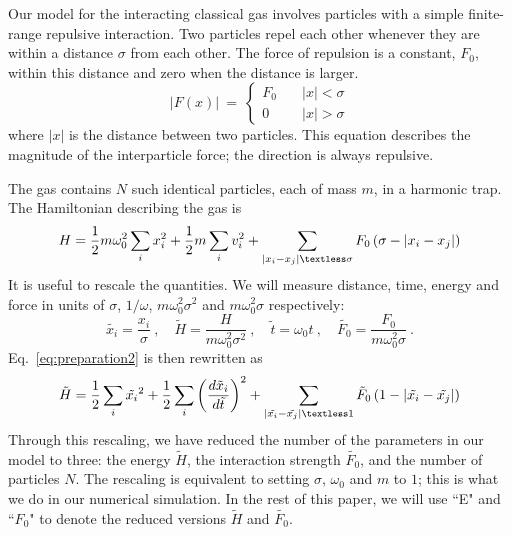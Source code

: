 \documentclass[onecolumn,pra]{revtex4-1}
\begin{document}
Our model for the interacting classical gas involves particles with a simple finite-range repulsive
interaction.  Two particles repel each other whenever they are within a distance $\sigma$ from each
other.  The force of repulsion is a constant, $F_0$, within this distance and zero when the distance
is larger. 
%
\begin{equation}
\Big| F(x) \Big| ~=~ \begin{cases}
F_0  &\quad |x|<\sigma\\
0  &\quad |x|>\sigma
\end{cases}
\label{eq:preparation1}
\end{equation}
where $|x|$ is the distance between two particles.  This equation describes the magnitude of the
interparticle force; the direction is always repulsive.

The gas contains $N$ such identical particles, each of mass $m$, in a harmonic trap.  The
Hamiltonian describing the gas is 
\begin{equation}
H=\frac{1}{2}m\omega_0^2\sum_{i}x_i^2+\frac{1}{2}m\sum_i
v_i^2+\sum_{\left|x_i-x_j\right|\textless\sigma}F_0\left(\sigma-\left|x_i-x_j\right|\right)
\label{eq:preparation2}
\end{equation}
%
It is useful to rescale the quantities.  We will measure distance, time, energy and force in units
of $\sigma$, $1/\omega$, $m\omega_0^2\sigma^2$ and $m\omega_0^2\sigma$ respectively:
\begin{equation} \label{eq:transform}
  \tilde{x_i} = \frac{x_i}{\sigma}\ , \quad 
  \tilde{H} = \frac{H}{m\omega_0^2\sigma^2}\ ,  \quad \tilde{t} = \omega_0t \ ,  \quad 
\tilde{F_0} = \frac{F_0}{m\omega_0^2\sigma}\ .
\end{equation}
%
Eq.~\ref{eq:preparation2} is then rewritten as
\begin{equation}
  \tilde{H} =
  \frac{1}{2}\sum_{i}\tilde{x_i}^2
  + \frac{1}{2}\sum_i\left(\frac{d\tilde{x}_i}{d\tilde{t}}\right)^2 
  + \sum_{\left|\tilde{x_i}-\tilde{x_j}\right|\textless
    1}\tilde{F}_0\left(1-\left|\tilde{x_i}-\tilde{x_j}\right|\right)  
\end{equation}
%
Through this rescaling, we have reduced the number of the parameters in our model to three: the
energy $\tilde{H}$, the interaction strength $\tilde{F_0}$, and the number of particles $N$.  The
rescaling is equivalent to setting $\sigma$, $\omega_0$ and $m$ to $1$; this is what we do in our
numerical simulation.  In the rest of this paper, we will use ``E" and ``$F_0$" to denote the
reduced versions $\tilde{H}$ and $\tilde{F_0}$.
\end{document}
